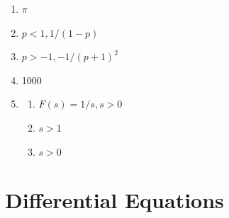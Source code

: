 \documentclass{article} \usepackage[margin=1in]{geometry}
\begin{document}
\begin{enumerate}
	\item $\pi$
	      \setcounter{enumi}{56}
	\item $p<1, 1/(1-p)$
	      \setcounter{enumi}{57}
	\item $p>-1, -1/(p+1)^2$
	      \setcounter{enumi}{70}
	\item 1000
	      \setcounter{enumi}{72}
	\item \begin{enumerate}
		      \item $F(s)=1/s, s>0$
		      \item $s>1$
		      \item $s>0$
	      \end{enumerate}
\end{enumerate}

\setcounter{section}{8}
\section{Differential Equations}
\end{document}
